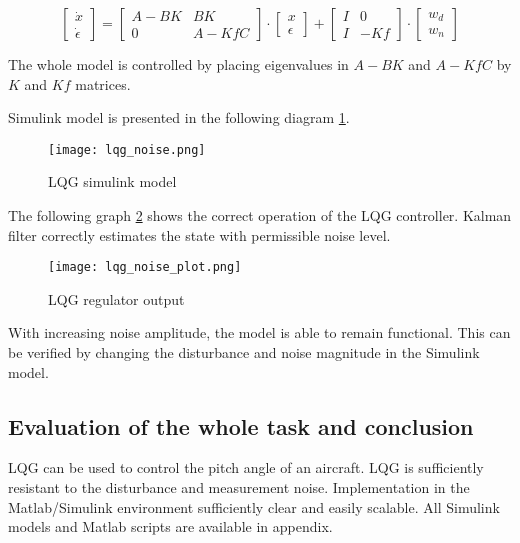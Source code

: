 \documentclass[../report.tex]{subfiles}
\begin{document}
\begin{equation}\label{lqg_final}
\begin{bmatrix} \dot{x} \\ \dot{\epsilon} \end{bmatrix}  = 
\begin{bmatrix} A-BK & BK \\ 0 & A-KfC \end{bmatrix} \cdot 
\begin{bmatrix} x \\ \epsilon \end{bmatrix} +
\begin{bmatrix} I & 0 \\
                I & -Kf
\end{bmatrix} \cdot
\begin{bmatrix} w_d \\ w_n \end{bmatrix}
\end{equation}

The whole model is controlled by placing eigenvalues in $A-BK$ and $A-KfC$
by $K$ and $Kf$ matrices. 
 

Simulink model is presented in the following diagram
\ref{fig:lqg_noise}.

\begin{figure}[hbt!]
    \centering
    \texttt{[image: lqg\_noise.png]}
    \caption{LQG simulink model}
    \label{fig:lqg_noise}
\end{figure}


The following graph \ref{fig:lqg_noise_plot} shows the correct operation
of the LQG controller. Kalman filter correctly estimates the state with
permissible noise level.

\begin{figure}[hbt!]
    \centering
    \texttt{[image: lqg\_noise\_plot.png]}
    \caption{LQG regulator output}
    \label{fig:lqg_noise_plot}
\end{figure}

With increasing noise amplitude, the model is able to remain functional.
This can be verified by changing the disturbance and noise magnitude in the
Simulink model.

\subsection{Evaluation of the whole task and conclusion}

LQG can be used to control the pitch angle of an aircraft. LQG is
sufficiently resistant to the disturbance and measurement noise.
Implementation in the Matlab/Simulink environment sufficiently clear and
easily scalable.
All Simulink models and Matlab scripts are available in appendix.
\end{document}
